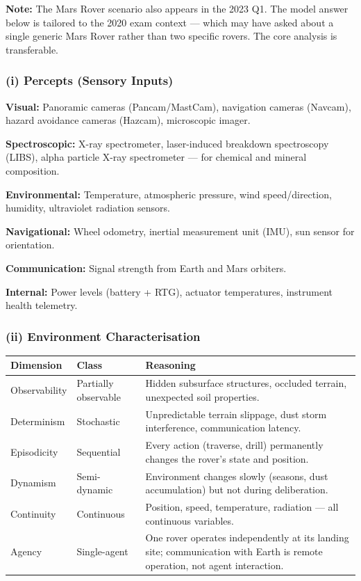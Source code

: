 \documentclass[12pt, a4paper]{article}
\begin{document}
\noindent\textbf{Note:} The Mars Rover scenario also appears in the 2023 Q1. The model answer below is tailored to the 2020 exam context — which may have asked about a single generic Mars Rover rather than two specific rovers. The core analysis is transferable.

\subsubsection*{(i) Percepts (Sensory Inputs)}

\begin{keypoints}
  \item \textbf{Visual:} Panoramic cameras (Pancam/MastCam), navigation cameras (Navcam), hazard avoidance cameras (Hazcam), microscopic imager.
  \item \textbf{Spectroscopic:} X-ray spectrometer, laser-induced breakdown spectroscopy (LIBS), alpha particle X-ray spectrometer — for chemical and mineral composition.
  \item \textbf{Environmental:} Temperature, atmospheric pressure, wind speed/direction, humidity, ultraviolet radiation sensors.
  \item \textbf{Navigational:} Wheel odometry, inertial measurement unit (IMU), sun sensor for orientation.
  \item \textbf{Communication:} Signal strength from Earth and Mars orbiters.
  \item \textbf{Internal:} Power levels (battery + RTG), actuator temperatures, instrument health telemetry.
\end{keypoints}

\subsubsection*{(ii) Environment Characterisation}

\begin{center}
\renewcommand{\arraystretch}{1.3}
\begin{tabular}{l|l|p{8.5cm}}
\toprule
\textbf{Dimension} & \textbf{Class} & \textbf{Reasoning} \\
\midrule
Observability & Partially observable & Hidden subsurface structures, occluded terrain, unexpected soil properties. \\
Determinism & Stochastic & Unpredictable terrain slippage, dust storm interference, communication latency. \\
Episodicity & Sequential & Every action (traverse, drill) permanently changes the rover's state and position. \\
Dynamism & Semi-dynamic & Environment changes slowly (seasons, dust accumulation) but not during deliberation. \\
Continuity & Continuous & Position, speed, temperature, radiation — all continuous variables. \\
Agency & Single-agent & One rover operates independently at its landing site; communication with Earth is remote operation, not agent interaction. \\
\bottomrule
\end{tabular}
\end{center}
\end{document}
